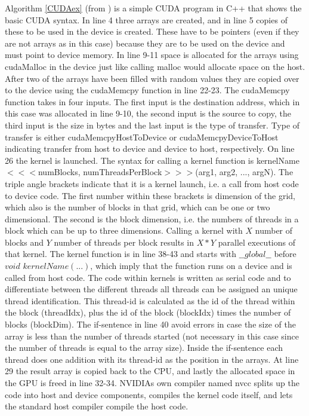Algorithm \ref{CUDAex} (from \cite{jason10}) is a simple CUDA program in C++ that shows the basic CUDA syntax. In line 4 three arrays are created, and in line 5 copies of these to be used in the device is created. These have to be pointers (even if they are not arrays as in this case) because they are to be used on the device and must point to device memory. In line 9-11 space is allocated for the arrays using cudaMalloc in the device just like calling malloc would allocate space on the host. After two of the arrays have been filled with random values they are copied over to the device using the cudaMemcpy function in line 22-23. The cudaMemcpy function takes in four inputs. The first input is the destination address, which in this case was allocated in line 9-10, the second input is the source to copy, the third input is the size in bytes and the last input is the type of transfer. Type of transfer is either cudaMemcpyHostToDevice or cudaMemcpyDeviceToHost indicating transfer from host to device and device to host, respectively. On line 26 the kernel is launched. The syntax for calling a kernel function is kernelName$<<<$numBlocks, numThreadsPerBlock$>>>$(arg1, arg2, ..., argN). The triple angle brackets indicate that it is a kernel launch, i.e. a call from host code to device code. The first number within these brackets is dimension of the grid, which also is the number of blocks in that grid, which can be one or two dimensional. The second is the block dimension, i.e. the numbers of threads in a block which can be up to three dimensions. Calling a kernel with $X$ number of blocks and $Y$ number of threads per block results in $X*Y$ parallel executions of that kernel. The kernel function is in line 38-43 and starts with $\_\_global\_\_$ before $void$ $kernelName(...)$, which imply that the function runs on a device and is called from host code. The code within kernels is written as serial code and to differentiate between the different threads all threads can be assigned an unique thread identification. This thread-id is calculated as the id of the thread within the block (threadIdx), plus the id of the block (blockIdx) times the number of blocks (blockDim). The if-sentence in line 40 avoid errors in case the size of the array is less than the number of threads started (not necessary in this case since the number of threads is equal to the array size). Inside the if-sentence each thread does one addition with its thread-id as the position in the arrays.  At line 29 the result array is copied back to the CPU, and lastly the allocated space in the GPU is freed in line 32-34. NVIDIAs own compiler named nvcc splits up the code into host and device components, compiles the kernel code itself, and lets the standard host compiler compile the host code. 

















